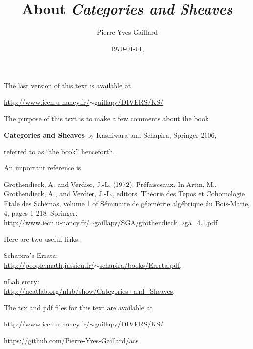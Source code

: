 \documentclass[12pt]{article}
\title{About \em{Categories and Sheaves}}
\author{Pierre-Yves Gaillard}
\date{\today, \currenttime}
\theoremstyle{remark}
\theoremstyle{definition}
\newcommand{\n}{\noindent}
\begin{document}
\maketitle

\n The last version of this text is available at

\n\href{http://www.iecn.u-nancy.fr/~gaillapy/DIVERS/KS/}{http://www.iecn.u-nancy.fr/$\sim$gaillapy/DIVERS/KS/}

\tableofcontents\newpage%

\n The purpose of this text is to make a few comments about the book%

\textbf{Categories and Sheaves} by Kashiwara and Schapira, Springer 2006,%

\n referred to as ``the book'' henceforth.%

An important reference is

\n[GV] Grothendieck, A. and Verdier, J.-L. (1972). Pr\'efaisceaux. In Artin, M., Grothendieck, A., and Verdier, J.-L., editors, Th\'eorie des Topos et Cohomologie Etale des Sch\'emas, volume 1 of S\'eminaire de g\'eom\'etrie alg\'ebrique du Bois-Marie, 4, pages 1-218. Springer. \\ 
\n\href{http://www.iecn.u-nancy.fr/~gaillapy/SGA/grothendieck_sga_4.1.pdf}{http://www.iecn.u-nancy.fr/$\sim$gaillapy/SGA/grothendieck\_sga\_4.1.pdf} 

Here are two useful links:

\n Schapira's Errata:\\ \href{http://people.math.jussieu.fr/~schapira/books/Errata.pdf}{http://people.math.jussieu.fr/$\sim$schapira/books/Errata.pdf},

\n nLab entry:\\ \href{http://ncatlab.org/nlab/show/Categories+and+Sheaves}{http://ncatlab.org/nlab/show/Categories+and+Sheaves}. 

The tex and pdf files for this text are available at 
 
\n\href{http://www.iecn.u-nancy.fr/~gaillapy/DIVERS/KS/}{http://www.iecn.u-nancy.fr/$\sim$gaillapy/DIVERS/KS/} 
 
 

\n\href{https://github.com/Pierre-Yves-Gaillard/acs}{https://github.com/Pierre-Yves-Gaillard/acs} 
\end{document}

